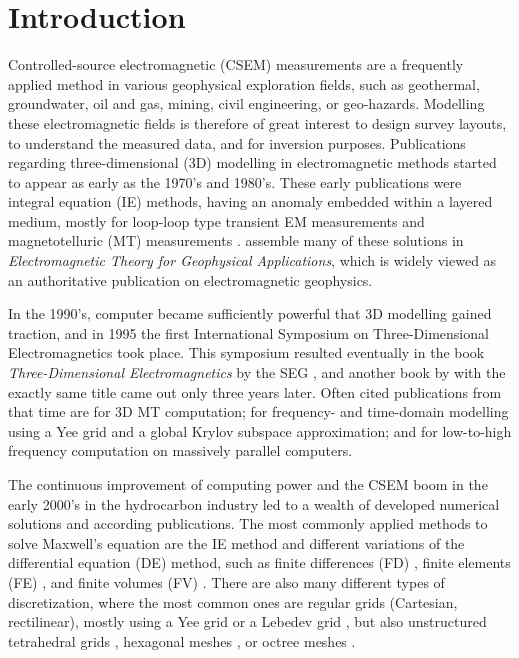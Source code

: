 \documentclass[
    paper,
  ]{geophysics}
\begin{document}
\section{Introduction}

Controlled-source electromagnetic (CSEM) measurements are a frequently applied method in various geophysical exploration fields, such as geothermal, groundwater, oil and gas, mining, civil engineering, or geo-hazards. Modelling these electromagnetic fields is therefore of great interest to design survey layouts, to understand the measured data, and for inversion purposes. Publications regarding three-dimensional (3D) modelling in electromagnetic methods started to appear as early as the 1970's and 1980's. These early publications were integral equation (IE) methods, having an anomaly embedded within a layered medium, mostly for loop-loop type transient EM measurements \citep{GJI.74.Raiche, GEO.75.Hohmann, GJI.82.Das, GEO.86.Newman} and magnetotelluric (MT) measurements \citep{GEO.84.Wannamaker}. \cite{B.SEG.88.Ward} assemble many of these solutions in \emph{Electromagnetic Theory for Geophysical Applications}, which is widely viewed as an authoritative publication on electromagnetic geophysics.

In the 1990's, computer became sufficiently powerful that 3D modelling gained traction, and in 1995 the first International Symposium on Three-Dimensional Electromagnetics took place. This symposium resulted eventually in the book \emph{Three-Dimensional Electromagnetics} by the SEG \citep{B.SEG.99.Oristaglio}, and another book by \cite{B.02.Wannamaker} with the exactly same title came out only three years later. Often cited publications from that time are \cite{RSC.94.Mackie} for 3D MT computation; \cite{RS.94.Druskin} for frequency- and time-domain modelling using a Yee grid and a global Krylov subspace approximation; and \cite{RS.96.Alumbaugh, GJI.97.Newman} for low-to-high frequency computation on massively parallel computers.

The continuous improvement of computing power and the CSEM boom in the early 2000's in the hydrocarbon industry led to a wealth of developed numerical solutions and according publications. The most commonly applied methods to solve Maxwell's equation are the IE method \citep{GJI.74.Raiche, RS.02.Hursan, GEO.06.Zhdanov, GP.10.Tehrani, CAG.16.Kruglyakov, MGS.17.Kruglyakov} and different variations of the differential equation (DE) method, such as finite differences (FD) \citep{GEO.93.Wang, RSC.94.Mackie, RS.94.Druskin, GEO.09.Streich, CAG.13.Sommer}, finite elements (FE) \citep{GEO.04.Commer, GJI.11.Schwarzbach,GEO.12.daSilva, GJI.13.Grayver, GJI.13.Puzyrev, SEG.16.Zhang}, and finite volumes (FV) \citep{EM.90.Madsen, SIAM.01.Haber, PIER.01.Clemens, GEO.14.Jahandari}. There are also many different types of discretization, where the most common ones are regular grids (Cartesian, rectilinear), mostly using a Yee grid \citep{IEEE.66.Yee} or a Lebedev grid \citep{CMMP.64.Lebedev}, but also unstructured tetrahedral grids \citep{SEG.16.Zhang, CAG.17.Cai}, hexagonal meshes \citep{CAG.14.Cai}, or octree meshes \citep{ECP.07.Haber}.
\end{document}

